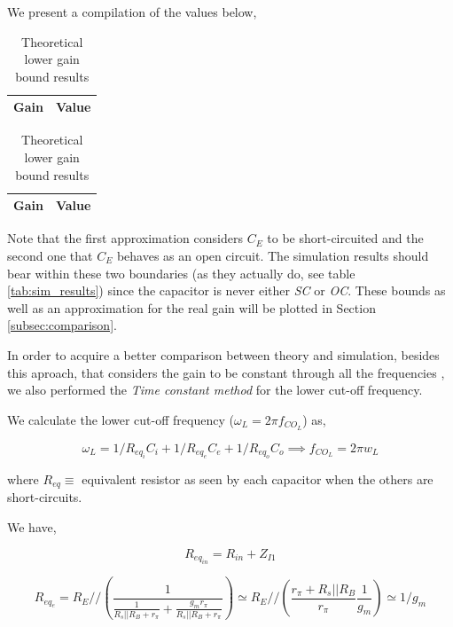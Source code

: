 We present a compilation of the values below,


\begin{table}[h]
\parbox{.4\linewidth}{
  \centering
    \begin{tabular}{|l|c|}
    \hline
    {\bf Gain} & {\bf Value} \\ \hline
    
    \end{tabular}
    \caption{Theoretical upper gain bound results}
    \label{tab:theo_gains_high}
  }
  \hfill
  \parbox{.4\textwidth}{
  \centering  
  \begin{tabular}{|c|c|}
    \hline    
    {\bf Gain} & {\bf Value} \\ \hline
    
  \end{tabular}
  \caption{Theoretical lower gain bound results}
  \label{tab:theo_gains_low}
  }
  \end{table}
  
Note that the first approximation considers $C_E$ to be short-circuited and the second one that $C_E$ behaves as an open circuit. The simulation results should bear within these two boundaries (as they actually do, see table \ref{tab:sim_results}) since the capacitor is never either \textit{SC} or \textit{OC}. These bounds as well as an approximation for the real gain will be plotted in Section \ref{subsec:comparison}.

In order to acquire a better comparison between theory and simulation, besides this aproach, that considers the gain to be constant through all the frequencies , we also performed the \textit{Time constant method} for the lower cut-off frequency.

We calculate the lower cut-off frequency ($\omega_L=2\pi f_{CO_L}$) as,

\begin{equation}
    \omega_L=1/{R_{eq_i}C_i} + 1/{R_{eq_e}C_e} + 1/{R_{eq_o}C_o}
    \implies f_{CO_L}=2\pi w_L
\end{equation}

where $R_{eq}\equiv$ equivalent resistor as seen by each capacitor when the others are short-circuits.

We have,

\begin{equation}
    R_{eq_{in}} = R_{in}+Z_{I1}
\end{equation}

\begin{equation}
    R_{eq_e} = R_E // (\frac{1}{\frac{1}{R_s||R_B+r_{\pi}}+\frac{g_m r_{\pi}}{R_s||R_B+r_{\pi}}}) \simeq R_E//(\frac{r_{\pi}+R_s||R_B}{r_{\pi}}\frac{1}{g_m}) \simeq 1/g_{m}
\end{equation}

